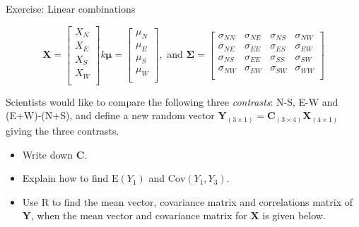 \documentclass[ignorenonframetext,]{beamer}
\providecommand{\tightlist}{%
  \setlength{\itemsep}{0pt}\setlength{\parskip}{0pt}}
\begin{document}
\begin{frame}

\begin{block}{Exercise: Linear combinations}

\[\boldsymbol{X}=\left[ \begin{array}{c} X_N\\
          X_E\\
X_S\\
          X_W\\
          \end{array}
          \right]k
          \boldsymbol{\mu}=\left[
      \begin{array}{c} \mu_N\\
          \mu_E\\
\mu_S\\
          \mu_W\\
          \end{array}
          \right], \text{ and } \boldsymbol\Sigma=\left[ \begin{array}{cccc}
    \sigma_{NN} & \sigma_{NE} & \sigma_{NS} & \sigma_{NW}\\
    \sigma_{NE} & \sigma_{EE} & \sigma_{ES}& \sigma_{EW}\\
        \sigma_{NS} & \sigma_{EE} & \sigma_{SS}& \sigma_{SW}\\
    \sigma_{NW} & \sigma_{EW} & \sigma_{SW} & \sigma_{WW}\\
\end{array} \right]\]

Scientists would like to compare the following three \emph{contrasts}:
N-S, E-W and (E+W)-(N+S), and define a new random vector
\(\boldsymbol{Y}_{(3\times 1)}=\boldsymbol{C}_{(3\times 4)} \boldsymbol{X}_{(4\times 1)}\)
giving the three contrasts.

\begin{itemize}
\tightlist
\item
  Write down \(\boldsymbol{C}\).
\item
  Explain how to find \(\text{E}(Y_1)\) and \(\text{Cov}(Y_1,Y_3)\).
\item
  Use R to find the mean vector, covariance matrix and correlations
  matrix of \(\boldsymbol{Y}\), when the mean vector and covariance
  matrix for \(\boldsymbol{X}\) is given below.
\end{itemize}

\end{block}

\end{frame}
\end{document}
